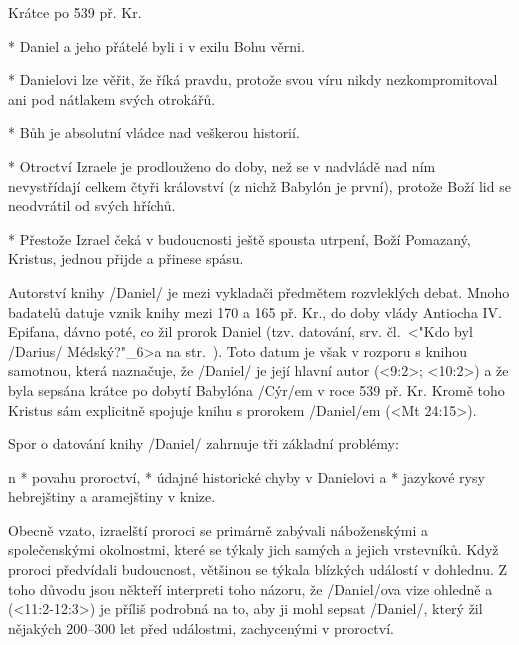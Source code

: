 
 Krátce po 539 př. Kr.


\begitems
* Daniel a jeho přátelé byli i v exilu Bohu věrni.

* Danielovi lze věřit, že říká pravdu, protože svou víru nikdy nezkompromitoval ani pod nátlakem svých otrokářů.

* Bůh je absolutní vládce nad veškerou historií.

* Otroctví Izraele je prodlouženo do doby, než se v nadvládě nad ním nevystřídají celkem čtyři  království (z nichž Babylón je první), protože Boží lid se neodvrátil od svých hříchů. 

* Přestože Izrael čeká v budoucnosti ještě spousta utrpení, Boží Pomazaný, Kristus, jednou přijde a přinese spásu.

\enditems




Autorství knihy \x/Daniel/ je mezi vykladači předmětem rozvleklých debat.
Mnoho badatelů datuje vznik knihy mezi 170 a 165 př. Kr., do doby vlády Antiocha IV. Epifana, dávno poté, co žil prorok Daniel (tzv.  datování, srv. čl.~<"Kdo byl \x/Darius/ Médský?"_6>a na str.~\pg). 
Toto datum je však v rozporu s knihou samotnou, která naznačuje, že \x/Daniel/ je její hlavní autor (<9:2>; <10:2>) a že byla sepsána krátce po dobytí Babylóna \x/Cýr/em v roce 539 př. Kr. Kromě toho  Kristus sám explicitně spojuje knihu s prorokem \x/Daniel/em (<Mt 24:15>).


Spor o datování knihy \x/Daniel/ zahrnuje tři základní problémy:

\begitems \style n
* povahu proroctví,
* údajné historické chyby v Danielovi a 
* jazykové rysy hebrejštiny a aramejštiny v knize.
\enditems

Obecně vzato, izraelští proroci se primárně zabývali náboženskými a společenskými okolnostmi, které se týkaly jich samých a jejich vrstevníků. Když proroci předvídali budoucnost, většinou se týkala blízkých událostí v dohlednu.
Z toho důvodu jsou někteří interpreti toho názoru, že \x/Daniel/ova vize ohledně  a  (<11:2-12:3>) je příliš podrobná na to, aby ji mohl sepsat \x/Daniel/, který žil nějakých 200--300 let před událostmi, zachycenými v proroctví.

